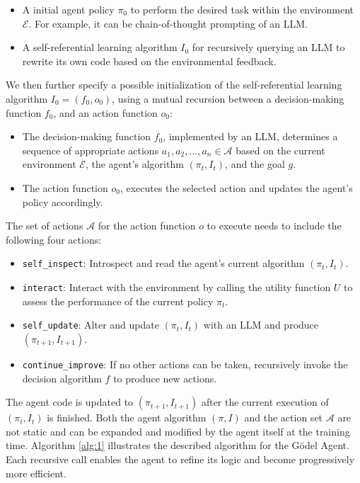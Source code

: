 \documentclass[11pt]{article}
\newcommand{\framework}{Gödel Agent\xspace}
\begin{document}
\begin{itemize}[leftmargin=*,itemsep=1pt]
    \item A initial agent policy $\pi_0$ to perform the desired task within the environment $\mathcal{E}$. For example, it can be chain-of-thought prompting of an LLM.
    \item A self-referential learning algorithm $I_0$ for recursively querying an LLM to rewrite its own code based on the environmental feedback.
\end{itemize}
We then further specify a possible initialization of the self-referential learning algorithm $I_0 = (f_0, o_0)$, using a mutual recursion between a decision-making function $f_0$, and an action function $o_0$:
\begin{itemize}[leftmargin=*,itemsep=1pt]
    \item The decision-making function $f_0$, implemented by an LLM, determines a sequence of appropriate actions $a_1, a_2, ..., a_n \in \mathcal{A}$ based on the current environment $\mathcal{E}$, the agent's algorithm $(\pi_t, I_t)$, and the goal $g$.
    \item The action function $o_0$, executes the selected action and updates the agent's policy accordingly. 
    
\end{itemize}



The set of actions $\mathcal{A}$ for the action function $o$ to execute needs to include the following four actions: 
\begin{itemize}[leftmargin=*,itemsep=1pt]
    \item \texttt{self\_inspect}: Introspect and read the agent's current algorithm $(\pi_t, I_t)$.
    \item \texttt{interact}: Interact with the environment by calling the utility function $U$ to assess the performance of the current policy $\pi_t$. 
    \item \texttt{self\_update}: Alter and update $(\pi_t, I_t)$ with an LLM and produce $(\pi_{t+1}, I_{t+1})$.
    \item \texttt{continue\_improve}: If no other actions can be taken, recursively invoke the decision algorithm $f$ to produce new actions.
\end{itemize}
The agent code is updated to $(\pi_{t+1}, I_{t+1})$ after the current execution of $(\pi_t, I_t)$ is finished.
Both the agent algorithm $(\pi, I)$ and the action set $\mathcal{A}$ are not static and can be expanded and modified by the agent itself at the training time.
Algorithm \ref{alg:1} illustrates the described algorithm for the \framework. Each recursive call enables the agent to refine its logic and become progressively more efficient.
\end{document}
